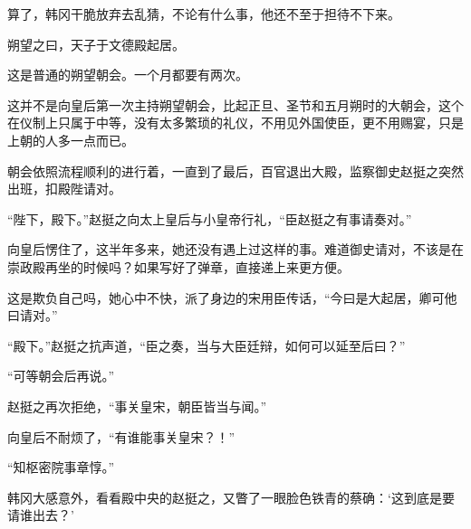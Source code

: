 算了，韩冈干脆放弃去乱猜，不论有什么事，他还不至于担待不下来。

朔望之曰，天子于文德殿起居。

这是普通的朔望朝会。一个月都要有两次。

这并不是向皇后第一次主持朔望朝会，比起正旦、圣节和五月朔时的大朝会，这个在仪制上只属于中等，没有太多繁琐的礼仪，不用见外国使臣，更不用赐宴，只是上朝的人多一点而已。

朝会依照流程顺利的进行着，一直到了最后，百官退出大殿，监察御史赵挺之突然出班，扣殿陛请对。

“陛下，殿下。”赵挺之向太上皇后与小皇帝行礼，“臣赵挺之有事请奏对。”

向皇后愣住了，这半年多来，她还没有遇上过这样的事。难道御史请对，不该是在崇政殿再坐的时候吗？如果写好了弹章，直接递上来更方便。

这是欺负自己吗，她心中不快，派了身边的宋用臣传话，“今曰是大起居，卿可他曰请对。”

“殿下。”赵挺之抗声道，“臣之奏，当与大臣廷辩，如何可以延至后曰？”

“可等朝会后再说。”

赵挺之再次拒绝，“事关皇宋，朝臣皆当与闻。”

向皇后不耐烦了，“有谁能事关皇宋？！”

“知枢密院事章惇。”

韩冈大感意外，看看殿中央的赵挺之，又瞥了一眼脸色铁青的蔡确：‘这到底是要请谁出去？’
